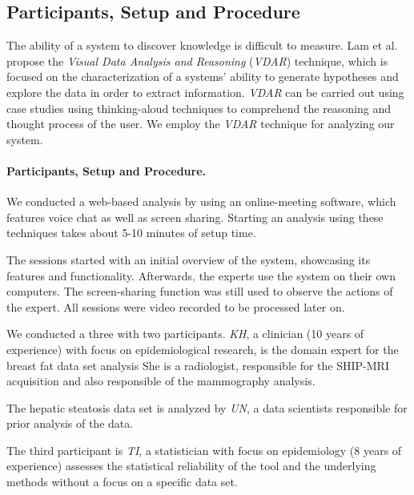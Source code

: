 \documentclass[journal]{style/vgtc} 			          %
\begin{document}
\subsection{Participants, Setup and Procedure}
The ability of a system to discover knowledge is difficult to measure.
Lam et al.~\cite{Lam2012} propose the \emph{Visual Data Analysis and Reasoning} (\emph{VDAR}) technique, which is focused on the characterization of a systems' ability to generate hypotheses and explore the data in order to extract information.
\emph{VDAR} can be carried out using case studies using thinking-aloud techniques to comprehend the reasoning and thought process of the user.
We employ the \emph{VDAR} technique for analyzing our system.
\paragraph{Participants, Setup and Procedure.}
We conducted a web-based analysis by using an online-meeting software, which features voice chat as well as screen sharing.
Starting an analysis using these techniques takes about 5-10 minutes of setup time.

The sessions started with an initial overview of the system, showcasing its features and functionality.
Afterwards, the experts use the system on their own computers.
The screen-sharing function was still used to observe the actions of the expert.
All sessions were video recorded to be processed later on.

We conducted a three with two participants. %
\emph{KH}, a clinician (10 years of experience) with focus on epidemiological research, is the domain expert for the breast fat data set analysis
She is a radiologist, responsible for the SHIP-MRI acquisition and also responsible of the mammography analysis.

The hepatic steatosis data set is analyzed by \emph{UN}, a data scientists responsible for prior analysis of the data.

The third participant is \emph{TI}, a statistician with focus on epidemiology (8 years of experience) assesses the statistical reliability of the tool and the underlying methods without a focus on a specific data set.
\end{document}
